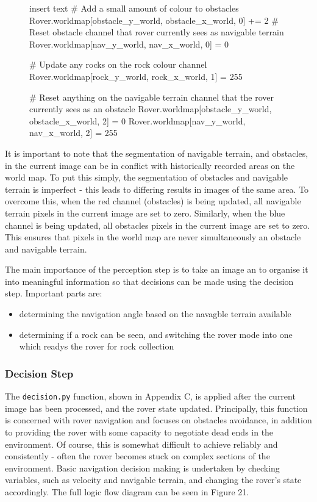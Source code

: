 \documentclass[a4paper]{article}
\begin{document}
\begin{figure}[h]\scriptsize
\begin{sexylisting}{insert text}
# Add a small amount of colour to obstacles
    Rover.worldmap[obstacle_y_world, obstacle_x_world, 0] += 2
    # Reset obstacle channel that rover currently sees as navigable terrain
    Rover.worldmap[nav_y_world, nav_x_world, 0] = 0
    
    # Update any rocks on the rock colour channel
    Rover.worldmap[rock_y_world, rock_x_world, 1] = 255 
    
    # Reset anything on the navigable terrain channel that the rover currently sees as an obstacle
    Rover.worldmap[obstacle_y_world, obstacle_x_world, 2] = 0
    Rover.worldmap[nav_y_world, nav_x_world, 2] = 255
\end{sexylisting}
\end{figure}

It is important to note that the segmentation of navigable terrain, and obstacles, in the current image can be in conflict with historically recorded areas on the world map. To put this simply, the segmentation of obstacles and navigable terrain is imperfect - this leads to differing results in images of the same area. To overcome this, when the red channel (obstacles) is being updated, all navigable terrain pixels in the current image are set to zero. Similarly, when the blue channel is being updated, all obstacles pixels in the current image are set to zero. This ensures that pixels in the world map are never simultaneously an obstacle and navigable terrain.

The main importance of the perception step is to take an image an to organise it into meaningful information so that decisions can be made using the decision step. Important parts are:
\begin{itemize}
\item determining the navigation angle based on the navagble terrain available
\item determining if a rock can be seen, and switching the rover mode into one which readys the rover for rock collection
\end{itemize}

\subsubsection{Decision Step}
The \verb|decision.py| function, shown in Appendix C, is applied after the current image has been processed, and the rover state updated. Principally, this function is concerned with rover navigation and focuses on obstacles avoidance, in addition to providing the rover with some capacity to negotiate dead ends in the environment. Of course, this is somewhat difficult to achieve reliably and consistently - often the rover becomes stuck on complex sections of the environment. Basic navigation decision making is undertaken by checking variables, such as velocity and navigable terrain, and changing the rover's state accordingly. The full logic flow diagram can be seen in Figure 21.
\end{document}
